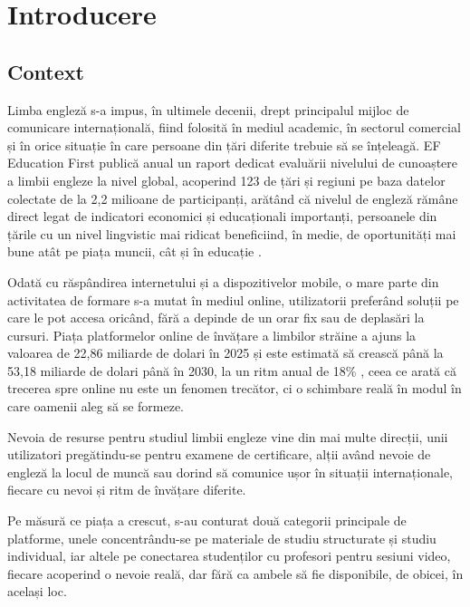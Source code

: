 \chapter{Introducere}

\section{Context}
Limba engleză s-a impus, în ultimele decenii, drept principalul mijloc de comunicare internațională, fiind folosită în mediul academic, în sectorul comercial și în orice situație în care persoane din țări diferite trebuie să se înțeleagă. EF Education First publică anual un raport dedicat evaluării nivelului de cunoaștere a limbii engleze la nivel global, acoperind 123 de țări și regiuni pe baza datelor colectate de la 2,2 milioane de participanți, arătând că nivelul de engleză rămâne direct legat de indicatori economici și educaționali importanți, persoanele din țările cu un nivel lingvistic mai ridicat beneficiind, în medie, de oportunități mai bune atât pe piața muncii, cât și în educație \cite{efepi2025}.

Odată cu răspândirea internetului și a dispozitivelor mobile, o mare parte din activitatea de formare s-a mutat în mediul online, utilizatorii preferând soluții pe care le pot accesa oricând, fără a depinde de un orar fix sau de deplasări la cursuri. Piața platformelor online de învățare a limbilor străine a ajuns la valoarea de 22,86 miliarde de dolari în 2025 și este estimată să crească până la 53,18 miliarde de dolari până în 2030, la un ritm anual de 18\% \cite{ollgmr2026}, ceea ce arată că trecerea spre online nu este un fenomen trecător, ci o schimbare reală în modul în care oamenii aleg să se formeze.

Nevoia de resurse pentru studiul limbii engleze vine din mai multe direcții, unii utilizatori pregătindu-se pentru examene de certificare, alții având nevoie de engleză la locul de muncă sau dorind să comunice ușor în situații internaționale, fiecare cu nevoi și ritm de învățare diferite.

Pe măsură ce piața a crescut, s-au conturat două categorii principale de platforme, unele concentrându-se pe materiale de studiu structurate și studiu individual, iar altele pe conectarea studenților cu profesori pentru sesiuni video, fiecare acoperind o nevoie reală, dar fără ca ambele să fie disponibile, de obicei, în același loc.

